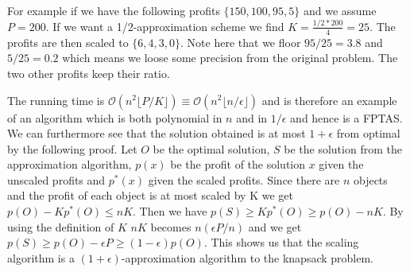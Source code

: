 For example if we have the following profits $\{ 150, 100, 95, 5 \}$ and we assume $P=200$. If we want a 1/2-approximation scheme we find $K=\frac{1/2*200}{4} = 25$. The profits are then scaled to $\{ 6, 4, 3, 0 \}$. Note here that we floor $95/25=3.8$ and $5/25=0.2$ which means we loose some precision from the original problem. The two other profits keep their ratio.

\newpar The running time is $\mathcal{O}(n^2 \lfloor P/K \rfloor) \equiv \mathcal{O}(n^2 \lfloor n/\epsilon \rfloor)$ and is therefore an example of an algorithm which is both polynomial in $n$ and in $1/\epsilon$ and hence is a FPTAS. We can furthermore see that the solution obtained is at most $1+\epsilon$ from optimal by the following proof. Let $O$ be the optimal solution, $S$ be the solution from the approximation algorithm, $p(x)$ be the profit of the solution $x$ given the unscaled profits and $p^*(x)$ given the scaled profits. Since there are $n$ objects and the profit of each object is at most scaled by K we get $p(O) - K p^*(O) \le n K$. Then we have $p(S) \ge K p^*(O) \ge p(O)-n K$. By using the definition of $K$ $n K$ becomes $n (\epsilon P/n)$ and we get $p(S) \ge p(O) - \epsilon P \ge (1-\epsilon) p(O)$. This shows us that the scaling algorithm is a $(1+\epsilon)$-approximation algorithm to the knapsack problem.
